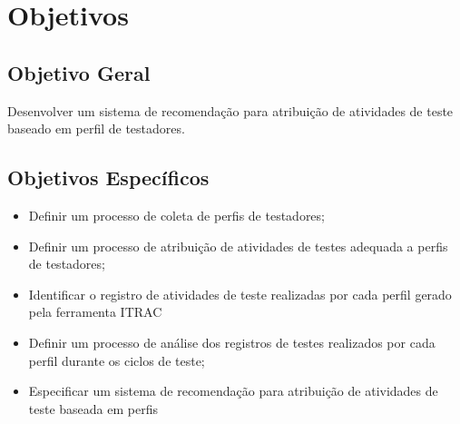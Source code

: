 \section{Objetivos}
\subsection{Objetivo Geral}

Desenvolver um sistema de recomendação para atribuição de atividades de teste baseado em perfil de testadores.

\subsection{Objetivos Específicos}

\begin{itemize}
		\item Definir um processo de coleta de perfis de testadores;
		\item Definir um processo de atribuição de atividades de testes adequada a perfis de testadores;
		\item Identificar o registro de atividades de teste realizadas por cada perfil gerado pela ferramenta ITRAC
		\item Definir um processo de análise dos registros de testes realizados por cada perfil durante os ciclos de teste;
		\item Especificar um sistema de recomendação para atribuição de atividades de teste baseada em perfis

	\end{itemize}
